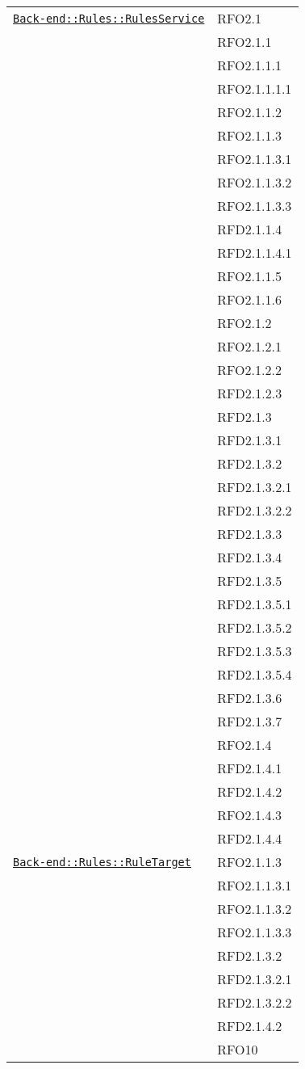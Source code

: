 \begin{longtable}{|>{\centering}m{10cm}|m{3cm}<{\centering}|}
\hyperref[Back-end::Rules::RulesService]{\texttt{Back-end::Rules::RulesService}} & RFO2.1\\
& RFO2.1.1\\
& RFO2.1.1.1\\
& RFO2.1.1.1.1\\
& RFO2.1.1.2\\
& RFO2.1.1.3\\
& RFO2.1.1.3.1\\
& RFO2.1.1.3.2\\
& RFO2.1.1.3.3\\
& RFD2.1.1.4\\
& RFD2.1.1.4.1\\
& RFO2.1.1.5\\
& RFO2.1.1.6\\
& RFO2.1.2\\
& RFO2.1.2.1\\
& RFO2.1.2.2\\
& RFD2.1.2.3\\
& RFD2.1.3\\
& RFD2.1.3.1\\
& RFD2.1.3.2\\
& RFD2.1.3.2.1\\
& RFD2.1.3.2.2\\
& RFD2.1.3.3\\
& RFD2.1.3.4\\
& RFD2.1.3.5\\
& RFD2.1.3.5.1\\
& RFD2.1.3.5.2\\
& RFD2.1.3.5.3\\
& RFD2.1.3.5.4\\
& RFD2.1.3.6\\
& RFD2.1.3.7\\
& RFO2.1.4\\
& RFD2.1.4.1\\
& RFD2.1.4.2\\
& RFO2.1.4.3\\
& RFD2.1.4.4\\ \hline

\hyperref[Back-end::Rules::RuleTarget]{\texttt{Back-end::Rules::RuleTarget}} & RFO2.1.1.3\\
& RFO2.1.1.3.1\\
& RFO2.1.1.3.2\\
& RFO2.1.1.3.3\\
& RFD2.1.3.2\\
& RFD2.1.3.2.1\\
& RFD2.1.3.2.2\\
& RFD2.1.4.2\\
& RFO10\\ \hline


\end{longtable}
